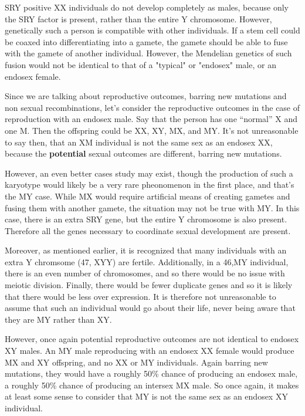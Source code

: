 \documentclass{article}
\begin{document}
SRY positive XX individuals do not develop completely as males, because only the SRY factor is present, rather than the entire Y chromosome. However, genetically such a person is compatible with other individuals. If a stem cell could be coaxed into differentiating into a gamete, the gamete should be able to fuse with the gamete of another individual. However, the Mendelian genetics of such fusion would not be identical to that of a "typical" or "endosex" male, or an endosex female. 

Since we are talking about reproductive outcomes, barring new mutations and non sexual recombinations, let’s consider the reproductive outcomes in the case of reproduction with an endosex male. Say that the person has one “normal” X and one M. Then the offspring could be XX, XY, MX, and MY. It’s not unreasonable to say then, that an XM individual is not the same sex as an endosex XX, because the \textbf{potential} sexual outcomes are different, barring new mutations. 

However, an even better cases study may exist, though the production of such a karyotype would likely be a very rare pheonomenon in the first place, and that's the MY case. While MX would require artificial means of creating gametes and fusing them with another gamete, the situation may not be true with MY. In this case, there is an extra SRY gene, but the entire Y chromosome is also present. Therefore all the genes necessary to coordinate sexual development are present. 

Moreover, as mentioned earlier, it is recognized that many individuals with an extra Y chromsome (47, XYY) are fertile\cite{BorjianBoroujeni2017}. Additionally, in a 46,MY individual, there is an even number of chromosomes, and so there would be no issue with meiotic division. Finally, there would be fewer duplicate genes and so it is likely that there would be less over expression. It is therefore not unreasonable to assume that such an individual would go about their life, never being aware that they are MY rather than XY.

However, once again potential reproductive outcomes are not identical to endosex XY males. An MY male reproducing with an endosex XX female would produce MX and XY offspring, and no XX or MY individuals. Again barring new mutations, they would have a roughly 50\% chance of producing an endosex male, a roughly 50\% chance of producing an intersex MX male. So once again, it makes at least some sense to consider that MY is not the same sex as an endosex XY individual. 
\end{document}
